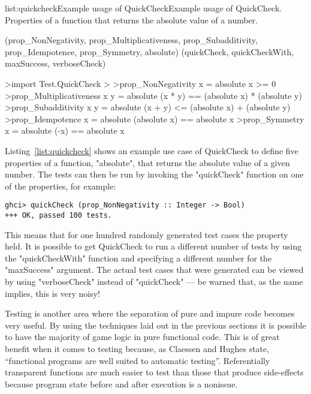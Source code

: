 \vspace{-0.5em}
\begin{listing}{list:quickcheck}{Example usage of QuickCheck}{Example usage of QuickCheck. Properties of a function that returns the absolute value of a number.}{}
\end{listing}\vspace{-1.5em}

\functions(prop_NonNegativity, prop_Multiplicativeness, prop_Subadditivity, prop_Idempotence, prop_Symmetry, absolute)
\functions(quickCheck, quickCheckWith, maxSuccess, verboseCheck)
\begin{haskell}
>import Test.QuickCheck
>
>prop_NonNegativity x = absolute x >= 0
>prop_Multiplicativeness x y = absolute (x * y) == (absolute x) * (absolute y)
>prop_Subadditivity x y = absolute (x + y) <= (absolute x) + (absolute y)
>prop_Idempotence x = absolute (absolute x) == absolute x
>prop_Symmetry x = absolute (-x) == absolute x

\end{haskell}
\noindent Listing~\ref{list:quickcheck} shows an example use case of QuickCheck to define five properties
of a function, "absolute", that returns the absolute value of a given number. The tests can then
be run by invoking the "quickCheck" function on one of the properties, for example:

\begin{verbatim}
ghci> quickCheck (prop_NonNegativity :: Integer -> Bool)
+++ OK, passed 100 tests.
\end{verbatim}

\noindent
This means that for one hundred randomly generated test cases the property held. It is
possible to get QuickCheck to run a different number of tests by using the "quickCheckWith"
function and specifying a different number for the "maxSuccess" argument. The actual
test cases that were generated can be viewed by using "verboseCheck" instead of "quickCheck"
--- be warned that, as the name implies, this is very noisy!

Testing is another area where the separation of pure and impure code becomes very useful.
By using the techniques laid out in the previous sections it is possible to have the majority
of game logic in pure functional code. This is of great benefit when it comes to testing
because, as Claessen and Hughes state, ``functional programs are well suited to automatic
testing''.\cite{claessen2000} Referentially transparent functions are much easier to test
than those that produce side-effects because program state before and after execution
is a nonissue.

